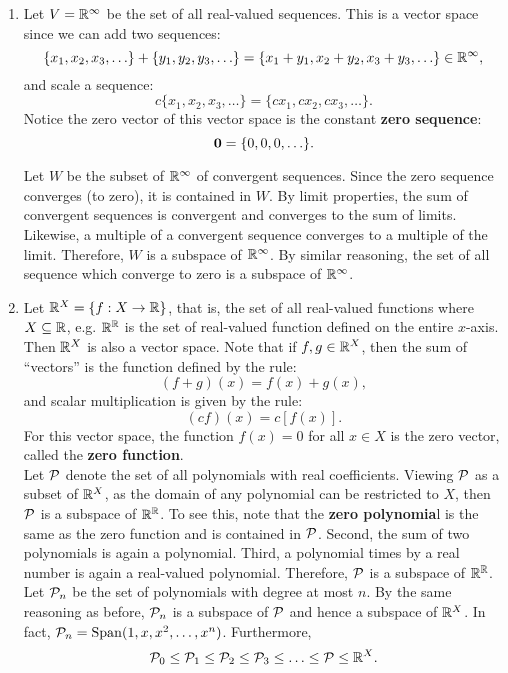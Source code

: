 \begin{Exam}\mbox{}
\begin{enumerate}
\item Let $V = \R^\infty$ be the set of all real-valued sequences. This is a vector space since we can add two sequences:
\[\{x_1, x_2, x_3,\ldots \} + \{y_1, y_2, y_3,\ldots\} = \{x_1+y_1, x_2+y_2, x_3+y_3,\ldots \}\in\R^\infty,\] and scale a sequence:
\[c\{x_1, x_2, x_3,\ldots \} = \{cx_1, cx_2, cx_3,\ldots \}.\]  Notice the zero vector of this vector space is the constant \textbf{zero sequence}:
\[\bb 0 = \{0,0,0,\ldots\}.\] 

Let $W$ be the subset of $\R^\infty$ of convergent sequences. Since the zero sequence converges (to zero), it is contained in $W$. By limit properties, the sum of convergent sequences is convergent and converges to the sum of limits. Likewise, a multiple of a convergent sequence converges to a multiple of the limit. Therefore, $W$ is a subspace of $\R^\infty$. By similar reasoning, the set of all sequence which converge to zero is a subspace of $\R^\infty$.\\

\item Let $\R^{X} = \{f : X\to \R\}$, that is, the set of all real-valued functions where $X\subseteq \R$, e.g. $\R^\R$ is the set of real-valued function defined on the entire $x$-axis. Then $\R^X$ is also a vector space. Note that if $f, g\in \R^X$, then the sum of ``vectors'' is the function defined by the rule:
\[(f+g)(x) = f(x) +g(x),\] and scalar multiplication is given by the rule:
\[(cf)(x) = c[f(x)].\] For this vector space, the function $f(x) = 0$ for all $x\in X$ is the zero vector, called the \textbf{zero function}.\\

Let $\P$ denote the set of all polynomials with real coefficients. Viewing $\P$ as a subset of $\R^X$, as the domain of any polynomial can be restricted to $X$, then $\P$ is a subspace of $\R^\R$. To see this, note that the \textbf{zero polynomia}l is the same as the zero function and is contained in $\P$. Second, the sum of two polynomials is again a polynomial. Third, a polynomial times by a real number is again a real-valued polynomial. Therefore, $\P$ is a subspace of $\R^\R$.\\

Let $\P_n$ be the set of polynomials with degree at most $n$. By the same reasoning as before, $\P_n$ is a subspace of $\P$ and hence a subspace of $\R^X$. In fact, $\P_n = \Span(1, x, x^2, \ldots, x^n)$. Furthermore,  
\[\P_0 \le \P_1\le \P_2 \le \P_3\le \ldots \le \P \le \R^X.\]


\end{enumerate}
\end{Exam}
